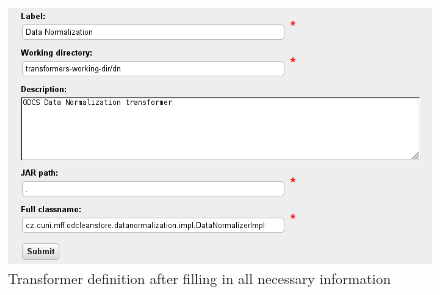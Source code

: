 \begin{enumerate}
\begin{figure}[!ht]
    \centering
    \includegraphics[width=\textwidth]{images/fe-walkthrough-new-transformer.png}
    \caption{Transformer definition after filling in all necessary information}
	\label{fig:feWTNewTransformers}
\end{figure}

\FloatBarrier

\end{enumerate}

\newpage
